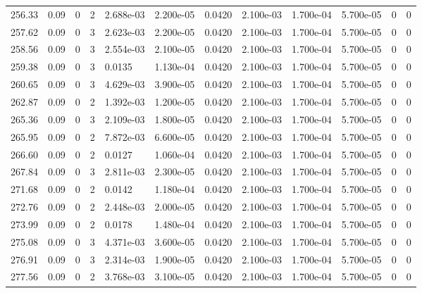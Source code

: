 \documentclass[preview]{standalone}
\begin{document}
{{{{{{{\begin{tabular}{L{1.2cm}C{1.2cm} C{0.3cm}C{0.5cm} C{1.4cm}C{1.4cm} C{1.4cm}C{1.4cm} C{1.6cm}C{1.6cm} C{1.6cm}C{1.6cm}}
  256.33  &  0.09  & 0     &  2 &  2.688e-03  & 2.200e-05  &  0.0420&   2.100e-03& 1.700e-04 & 5.700e-05   &  0 & 0  \\ 
  257.62  &  0.09  & 0     &  3 &  2.623e-03  & 2.200e-05  &  0.0420&   2.100e-03& 1.700e-04 & 5.700e-05   &  0 & 0  \\ 
  258.56  &  0.09  & 0     &  3 &  2.554e-03  & 2.100e-05  &  0.0420&   2.100e-03& 1.700e-04 & 5.700e-05   &  0 & 0  \\ 
  259.38  &  0.09  & 0     &  3 &  0.0135  & 1.130e-04  &  0.0420&   2.100e-03& 1.700e-04 & 5.700e-05   &  0 & 0  \\ 
  260.65  &  0.09  & 0     &  3 &  4.629e-03  & 3.900e-05  &  0.0420&   2.100e-03& 1.700e-04 & 5.700e-05   &  0 & 0  \\ 
  262.87  &  0.09  & 0     &  2 &  1.392e-03  & 1.200e-05  &  0.0420&   2.100e-03& 1.700e-04 & 5.700e-05   &  0 & 0  \\ 
  265.36  &  0.09  & 0     &  3 &  2.109e-03  & 1.800e-05  &  0.0420&   2.100e-03& 1.700e-04 & 5.700e-05   &  0 & 0  \\ 
  265.95  &  0.09  & 0     &  2 &  7.872e-03  & 6.600e-05  &  0.0420&   2.100e-03& 1.700e-04 & 5.700e-05   &  0 & 0  \\ 
  266.60  &  0.09  & 0     &  2 &  0.0127  & 1.060e-04  &  0.0420&   2.100e-03& 1.700e-04 & 5.700e-05   &  0 & 0  \\ 
  267.84  &  0.09  & 0     &  3 &  2.811e-03  & 2.300e-05  &  0.0420&   2.100e-03& 1.700e-04 & 5.700e-05   &  0 & 0  \\ 
  271.68  &  0.09  & 0     &  2 &  0.0142  & 1.180e-04  &  0.0420&   2.100e-03& 1.700e-04 & 5.700e-05   &  0 & 0  \\ 
  272.76  &  0.09  & 0     &  2 &  2.448e-03  & 2.000e-05  &  0.0420&   2.100e-03& 1.700e-04 & 5.700e-05   &  0 & 0  \\ 
  273.99  &  0.09  & 0     &  2 &  0.0178  & 1.480e-04  &  0.0420&   2.100e-03& 1.700e-04 & 5.700e-05   &  0 & 0  \\ 
  275.08  &  0.09  & 0     &  3 &  4.371e-03  & 3.600e-05  &  0.0420&   2.100e-03& 1.700e-04 & 5.700e-05   &  0 & 0  \\ 
  276.91  &  0.09  & 0     &  3 &  2.314e-03  & 1.900e-05  &  0.0420&   2.100e-03& 1.700e-04 & 5.700e-05   &  0 & 0  \\ 
  277.56  &  0.09  & 0     &  2 &  3.768e-03  & 3.100e-05  &  0.0420&   2.100e-03& 1.700e-04 & 5.700e-05   &  0 & 0  \\ 
\hline 
\end{tabular} 

}}}}}}}
\end{document}

